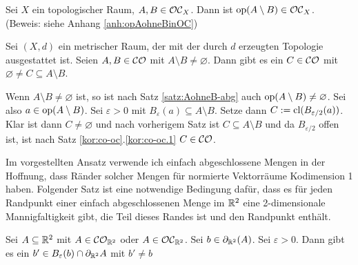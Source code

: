     
    \begin{satz}\label{satz:opAohneBinOC}
        Sei $X$ ein topologischer Raum, $A,B \in \mathcal{OC}_X$. Dann ist $\text{op}(A \setminus B) \in \mathcal{OC}_X$.\\
        (Beweis: siehe Anhang \ref{anh:opAohneBinOC})
    \end{satz}



    \begin{satz}
        Sei $(X,d)$ ein metrischer Raum, der mit der durch $d$ erzeugten Topologie ausgestattet ist. Seien $A,B \in \mathcal{CO}$ mit $A \setminus B \neq \varnothing$. Dann gibt es ein $C \in \mathcal{CO}$ mit $\varnothing \neq C \subseteq A \setminus B$.
    \end{satz}
    \begin{bew}
        Wenn $A \setminus B \neq \varnothing$ ist, so ist nach Satz \ref{satz:AohneB-abg} auch $\text{op}(A \setminus B) \neq \varnothing$. Sei also $a \in \text{op}(A \setminus B)$. Sei $\varepsilon > 0$ mit $B_\varepsilon(a) \subseteq A \setminus B$. Setze dann $C := \text{cl}(B_{\varepsilon / 2}(a))$. Klar ist dann $C \neq \varnothing$ und nach vorherigem Satz ist $C \subseteq A \setminus B$ und da $B_{\varepsilon / 2}$ offen ist, ist nach Satz \ref{kor:co-oc}.\ref{kor:co-oc.1} $C \in \mathcal{CO}$.
    \end{bew}


        Im
        vorgestellten Ansatz verwende ich einfach abgeschlossene Mengen in der Hoffnung, dass Ränder solcher Mengen für normierte Vektorräume Kodimension 1 haben. %
        Folgender Satz ist eine notwendige Bedingung dafür, dass es für jeden Randpunkt einer einfach abgeschlossenen Menge im $\mathbb{R}^2$ eine 2-dimensionale Mannigfaltigkeit gibt, die Teil dieses Randes ist und den Randpunkt enthält.

    \begin{satz}\label{satz:r2}
        Sei $A \subseteq \mathbb{R}^2$ mit $A \in \mathcal{CO}_{\mathbb{R}^2}$ oder $A \in \mathcal{OC}_{\mathbb{R}^2}$. Sei $b \in \partial_{\mathbb{R}^2}(A)$. Sei $\varepsilon > 0$. Dann gibt es ein $b' \in B_{\varepsilon}(b) \cap \partial_{\mathbb{R}^2} A$ mit $b' \neq b$
    \end{satz}


